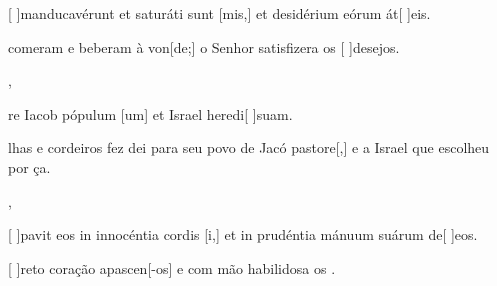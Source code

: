 {  {\item {}[ ]{man}ducavérunt et saturáti sunt [mis,] et desidérium eórum át[ ]{e}is.~\Antiphona}%
    {\item {} comeram e beberam à von[de;] o Senhor satisfizera os [ ]{de}{se}jos.~\Antiphona},
  {\item {}re Iacob pópulum [um] et Israel heredi[ ]{su}am.~\Antiphona}%
    {\item {}lhas e cordeiros fez dei para seu povo de Jacó pastore[,] e a Israel que escolheu por ça.~\Antiphona},
  {\item {}[ ]{pa}vit eos in innocéntia cordis [i,] et in prudéntia mánuum suárum de[ ]{e}os.~\Antiphona}%
    {\item {}[ ]{re}to coração apascen[-os] e com mão habilidosa os .~\Antiphona}
}
